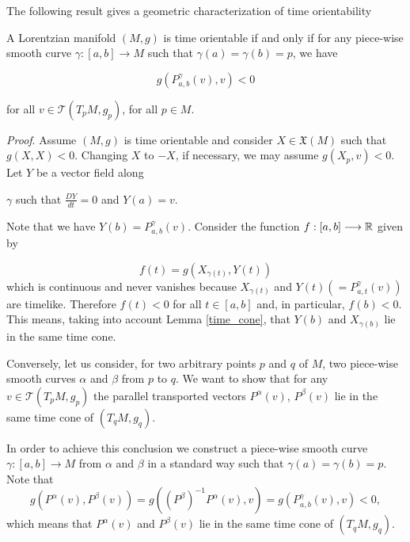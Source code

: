 

The following result gives a geometric characterization of time orientability \cite[p. 255]{S-W}


\begin{cor}\label{parallel_transport}

A Lorentzian manifold $(M,g)$ is time orientable if and only if for any piece-wise smooth curve $\gamma : [a,b] \longrightarrow M$ such that $\gamma(a)=\gamma(b)=p$, we have

\[

g(P_{a,b}^{\gamma}(v),v)<0

\]

for all $v\in \mathcal{T}(T_pM,g_p)$, for all $p \in M$.

\end{cor}


\noindent \emph{Proof}. Assume $(M,g)$ is time orientable and consider $X \in \mathfrak{X}(M)$ such that $g(X,X)<0$. Changing $X$ to $-X$, if necessary, we may assume $g(X_p,v)<0$. Let $Y$ be a vector field along

$\gamma$ such that $\frac{DY}{dt}=0$ and $Y(a)=v$.

Note that we have $Y(b)=P_{a,b}^{\gamma}(v)$. Consider the function $f : [a,b] \longrightarrow \mathbb{R}$ given by

\[

f(t)= g(X_{\gamma(t)},Y(t))

\] which is continuous and never vanishes because $X_{\gamma(t)}$ and $Y(t)(=P_{a,t}^{\gamma}(v))$ are timelike. Therefore $f(t)<0$ for all $t\in [a,b]$ and, in particular, $f(b)<0$. This means, taking into account Lemma \ref{time_cone}, that $Y(b)$ and $X_{\gamma(b)}$ lie in the same time cone.

Conversely, let us consider, for two arbitrary points $p$ and $q$ of $M$, two piece-wise smooth curves $\alpha$ and $\beta$ from $p$ to $q$. We want to show that for any $v\in \mathcal{T}(T_pM,g_p)$ the parallel transported vectors $P^{\alpha}(v)$, $P^{\beta}(v)$ lie in the same time cone of $(T_qM,g_q)$.

In order to achieve this conclusion we construct a piece-wise smooth curve $\gamma : [a,b] \longrightarrow M$ from $\alpha$ and $\beta$ in a standard way such that $\gamma(a)=\gamma(b)=p$. Note that $$g(P^{\alpha}(v),P^{\beta}(v))=g((P^{\beta})^{-1}P^{\alpha}(v),v)=g(P_{a,b}^{\gamma}(v),v)<0,$$ which means that $P^{\alpha}(v)$ and $P^{\beta}(v)$ lie in the same time cone of $(T_qM,g_q)$.

